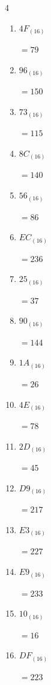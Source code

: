 \begin{multicols}{4}
\begin{enumerate}
\columnbreak %

  \item $4F_{(16)}$

        $=79$

  \item $96_{(16)}$

        $=150$

  \item $73_{(16)}$

        $=115$

  \item $8C_{(16)}$

        $=140$

  \item $56_{(16)}$

        $=86$

  \item $EC_{(16)}$

        $=236$

  \item $25_{(16)}$

        $=37$

  \item $90_{(16)}$

        $=144$

  \item $1A_{(16)}$

        $=26$

  \item $4E_{(16)}$

        $=78$

  \item $2D_{(16)}$

        $=45$

  \item $D9_{(16)}$

        $=217$

  \item $E3_{(16)}$

        $=227$

  \item $E9_{(16)}$

        $=233$

  \item $10_{(16)}$

        $=16$

\columnbreak %

  \item $DF_{(16)}$

        $=223$


\end{enumerate}
\end{multicols}
